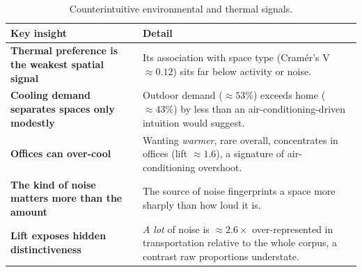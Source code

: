 \begin{table}[htbp]
\centering
\caption{Counterintuitive environmental and thermal signals.}
\label{tab:insights-counterintuitive}
\footnotesize
\renewcommand{\arraystretch}{1.3}
\begin{tabularx}{\textwidth}{@{}>{\raggedright\arraybackslash\bfseries}p{} >{\raggedright\arraybackslash}X@{}}
\toprule
\normalfont\textbf{Key insight} & \textbf{Detail} \\
\midrule
Thermal preference is the weakest spatial signal & Its association with space type (Cram\'er's V $\approx 0.12$) sits far below activity or noise. \\
Cooling demand separates spaces only modestly & Outdoor demand ($\approx 53\%$) exceeds home ($\approx 43\%$) by less than an air-conditioning-driven intuition would suggest. \\
Offices can over-cool & Wanting \emph{warmer}, rare overall, concentrates in offices (lift $\approx 1.6$), a signature of air-conditioning overshoot. \\
The kind of noise matters more than the amount & The source of noise fingerprints a space more sharply than how loud it is. \\
Lift exposes hidden distinctiveness & \emph{A lot} of noise is $\approx 2.6\times$ over-represented in transportation relative to the whole corpus, a contrast raw proportions understate. \\
\bottomrule
\end{tabularx}
\end{table}

